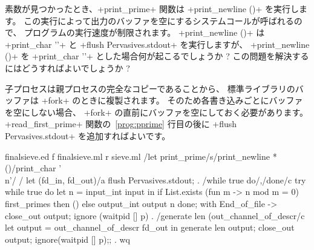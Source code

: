 \begin{exercise}
素数が見つかったとき、\ml+print_prime+ 関数は \ml+print_newline ()+ を実行します。
この実行によって出力のバッファを空にするシステムコールが呼ばれるので、
プログラムの実行速度が制限されます。
\ml+print_newline ()+ は \ml+print_char '\n'+ と \ml+flush Pervasives.stdout+ を実行しますが、
\ml+print_newline ()+ を \ml+print_char '\n'+ とした場合何が起こるでしょうか ?
この問題を解決するにはどうすればよいでしょうか ?
\end{exercise}
\begin{answer}
子プロセスは親プロセスの完全なコピーであることから、
標準ライブラリの\io バッファは \ml+fork+ のときに複製されます。
そのため各書き込みごとにバッファを空にしない場合、
\ml+fork+ の直前にバッファを空にしておく必要があります。
\ml+read_first_prime+ 関数の~\ref{prog:pprime} 行目の後に
\ml+flush Pervasives.stdout+ を追加すればよいです。
\end{answer}
%
\begin{codefile}{finalsieve.ed}
f finalsieve.ml
r sieve.ml
/let print_prime/s/print_newline *()/print_char '\\n'/
/    let (fd_in, fd_out)/a
    flush Pervasives.stdout;
.
/while true do/,/done/c
        try
          while true do
            let n = input_int input in
            if List.exists (fun m -> n mod m = 0) first_primes then ()
            else output_int output n
          done;
        with End_of_file ->
          close_out output;
          ignore (waitpid [] p)
.
/generate len (out_channel_of_descr/c
      let output = out_channel_of_descr fd_out in
      generate len output;
      close_out output;
      ignore(waitpid [] p);;
.
wq
\end{codefile}

